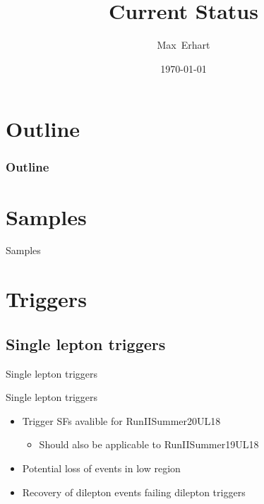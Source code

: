 \documentclass[18pt]{beamer}
\title[Current Status]{Current Status
}
\author[Max~Erhart]{Max~Erhart}
\date{\today}
\begin{document}


\begin{frame}
\titlepage
\end{frame}

\section*{Outline}
\begin{frame}[label={outline}]
	\frametitle{Outline}
	\tableofcontents
\end{frame}

\section{Samples}

\begin{frame}{Samples}
    
\end{frame}
\section{Triggers}

\subsection{Single lepton triggers}
\begin{frame}{Single lepton triggers}
	
\end{frame}

\begin{frame}{Single lepton triggers}
	\begin{itemize}
		\item Trigger SFs avalible for RunIISummer20UL18
		\begin{itemize}
			\item Should also be applicable to RunIISummer19UL18
		\end{itemize}
		\item Potential loss of events in low \pT region
		\item Recovery of dilepton events failing dilepton triggers
	\end{itemize}
	
\end{frame}
\end{document}
